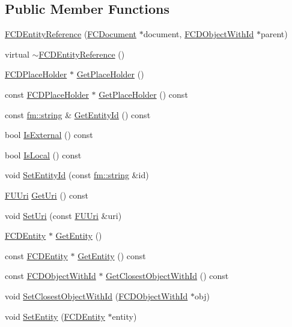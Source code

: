 \subsection*{Public Member Functions}
\begin{DoxyCompactItemize}
\item 
\hyperlink{classFCDEntityReference_aefeac7725c54f05187921e564897f948}{FCDEntityReference} (\hyperlink{classFCDocument}{FCDocument} $\ast$document, \hyperlink{classFCDObjectWithId}{FCDObjectWithId} $\ast$parent)
\item 
virtual \hyperlink{classFCDEntityReference_a1fcd3b0444c96a85d1156cbf974d6366}{$\sim$FCDEntityReference} ()
\item 
\hyperlink{classFCDPlaceHolder}{FCDPlaceHolder} $\ast$ \hyperlink{classFCDEntityReference_a7df4767dc82a8315766f8526db7781e0}{GetPlaceHolder} ()
\item 
const \hyperlink{classFCDPlaceHolder}{FCDPlaceHolder} $\ast$ \hyperlink{classFCDEntityReference_a51cb355f0b2647cb9ff8be45b749ab6d}{GetPlaceHolder} () const 
\item 
const \hyperlink{classfm_1_1stringT}{fm::string} \& \hyperlink{classFCDEntityReference_a71093d0985ba2c7c9a825c6732c3a983}{GetEntityId} () const 
\item 
bool \hyperlink{classFCDEntityReference_a7959b330c7b15c0eaab8179df82445c9}{IsExternal} () const 
\item 
bool \hyperlink{classFCDEntityReference_a54ed0344364c939510281b31290f4fed}{IsLocal} () const 
\item 
void \hyperlink{classFCDEntityReference_a40bc9d2d3bc84815bd948c34e483c389}{SetEntityId} (const \hyperlink{classfm_1_1stringT}{fm::string} \&id)
\item 
\hyperlink{classFUUri}{FUUri} \hyperlink{classFCDEntityReference_a0c7893555d3cd8bf87c6b13c54b26037}{GetUri} () const 
\item 
void \hyperlink{classFCDEntityReference_aa41da184d772a1e805290223fd794c79}{SetUri} (const \hyperlink{classFUUri}{FUUri} \&uri)
\item 
\hyperlink{classFCDEntity}{FCDEntity} $\ast$ \hyperlink{classFCDEntityReference_a0198480bac39a42d02618cf95657c98d}{GetEntity} ()
\item 
const \hyperlink{classFCDEntity}{FCDEntity} $\ast$ \hyperlink{classFCDEntityReference_a7c489cf6645eb19e3c0708da49ab3aa0}{GetEntity} () const 
\item 
const \hyperlink{classFCDObjectWithId}{FCDObjectWithId} $\ast$ \hyperlink{classFCDEntityReference_abdfe1fa4f0c01aba927b90bcd6965b26}{GetClosestObjectWithId} () const 
\item 
void \hyperlink{classFCDEntityReference_a7fa9539ed0a87e9be443e46c7fa086f6}{SetClosestObjectWithId} (\hyperlink{classFCDObjectWithId}{FCDObjectWithId} $\ast$obj)
\item 
void \hyperlink{classFCDEntityReference_a0fb3981482f2894cd778d05d46937fa2}{SetEntity} (\hyperlink{classFCDEntity}{FCDEntity} $\ast$entity)
\end{DoxyCompactItemize}


